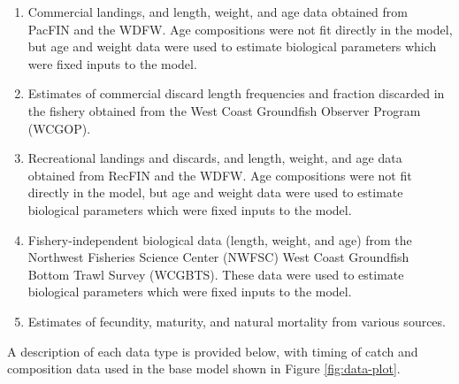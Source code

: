 \documentclass[11pt,
  english,
  letterpaper,
]{article}
\begin{document}
\begin{enumerate}
\def\labelenumi{\arabic{enumi}.}
\item

  Commercial landings, and length, weight, and age data obtained from PacFIN and the WDFW. Age compositions were not fit directly in the model, but age and weight data were used to estimate biological parameters which were fixed inputs to the model.

  \tagmcend\tagstructend\tagstructend
\item

  Estimates of commercial discard length frequencies and fraction discarded in the fishery obtained from the West Coast Groundfish Observer Program (WCGOP).

  \tagmcend\tagstructend\tagstructend
\item

  Recreational landings and discards, and length, weight, and age data obtained from RecFIN and the WDFW. Age compositions were not fit directly in the model, but age and weight data were used to estimate biological parameters which were fixed inputs to the model.

  \tagmcend\tagstructend\tagstructend
\item

  Fishery-independent biological data (length, weight, and age) from the Northwest Fisheries Science Center (NWFSC) West Coast Groundfish Bottom Trawl Survey (WCGBTS). These data were used to estimate biological parameters which were fixed inputs to the model.

  \tagmcend\tagstructend\tagstructend
\item

  Estimates of fecundity, maturity, and natural mortality from various sources.

  \tagmcend\tagstructend\tagstructend
\end{enumerate}

\tagstructend


A description of each data type is provided below, with timing of catch and composition data used in the base model shown in Figure \ref{fig:data-plot}.
\end{document}
